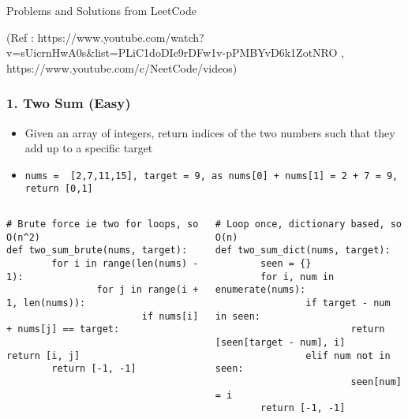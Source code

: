 \begin{frame}[fragile]\frametitle{}
\begin{center}
{\Large Problems and Solutions from LeetCode}
\end{center}

	{\tiny (Ref :  https://www.youtube.com/watch?v=sUicrnHwA0s\&list=PLiC1doDIe9rDFw1v-pPMBYvD6k1ZotNRO , https://www.youtube.com/c/NeetCode/videos)}

\end{frame}

\begin{frame}[fragile]\frametitle{1. Two Sum (Easy)}

	\begin{itemize}
	\item Given an array of integers, return indices of the two numbers such that they add up to a specific target
	\item \lstinline|nums =  [2,7,11,15], target = 9, as nums[0] + nums[1] = 2 + 7 = 9, return [0,1]|
	\end{itemize}
	
	\begin{columns}[T]
		\begin{lstlisting}[basicstyle=\scriptsize]
# Brute force ie two for loops, so O(n^2)
def two_sum_brute(nums, target):
		for i in range(len(nums) - 1):
				for j in range(i + 1, len(nums)):
						if nums[i] + nums[j] == target:
								return [i, j]
		return [-1, -1]		
		\end{lstlisting}
		\begin{lstlisting}[basicstyle=\scriptsize]
# Loop once, dictionary based, so O(n)
def two_sum_dict(nums, target):
		seen = {}
		for i, num in enumerate(nums):
				if target - num in seen:
						return [seen[target - num], i]
				elif num not in seen:
						seen[num] = i
		return [-1, -1]	
				\end{lstlisting}		
	\end{columns}
	
	
\end{frame}

